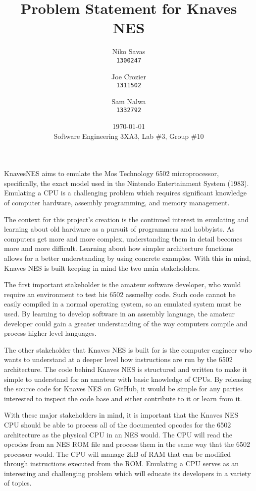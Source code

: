 \documentclass[12pt]{article}
\begin{document}
\title{Problem Statement for Knaves NES}
\date{\today\\
	{\medskip\small Software Engineering 3XA3, Lab \#3, Group \#10}
}
\author{Niko Savas\\
	\texttt{1300247}
	\and
	Joe Crozier\\
	\texttt{1311502}
	\and
	Sam Nalwa\\
	\texttt{1332792}
}
	
\maketitle

KnavesNES aims to emulate the Mos Technology 6502 microprocessor, specifically, the exact model used in the Nintendo Entertainment System (1983). Emulating a CPU is a challenging problem which requires significant knowledge of computer hardware, assembly programming, and memory management.

The context for this project's creation is the continued interest in emulating and learning about old hardware as a pursuit of programmers and hobbyists. As computers get more and more complex, understanding them in detail becomes more and more difficult. Learning about how simpler architecture functions allows for a better understanding by using concrete examples. With this in mind, Knaves NES is built keeping in mind the two main stakeholders.

The first important stakeholder is the amateur software developer, who would require an environment to test his 6502 assmelby code. Such code cannot be easily compiled in a normal operating system, so an emulated system must be used. By learning to develop software in an assembly language, the amateur developer could gain a greater understanding of the way computers compile and process higher level languages.

The other stakeholder that Knaves NES is built for is the computer engineer who wants to understand at a deeper level how instructions are run by the 6502 architecture. The code behind Knaves NES is structured and written to make it simple to understand for an amateur with basic knowledge of CPUs. By releasing the source code for Knaves NES on GitHub, it would be simple for any parties interested to inspect the code base and either contribute to it or learn from it.

With these major stakeholders in mind, it is important that the Knaves NES CPU should be able to process all of the documented opcodes for the 6502 architecture as the physical CPU in an NES would. The CPU will read the opcodes from an NES ROM file and process them in the same way that the 6502 processor would. The CPU will manage 2kB of RAM that can be modified through instructions executed from the ROM. Emulating a CPU serves as an interesting and challenging problem which will educate its developers in a variety of topics.
\end{document}

